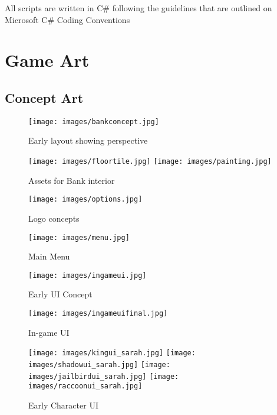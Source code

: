 \documentclass[14pt]{report}
\begin{document}
All scripts are written in C\# following the guidelines that are outlined on Microsoft C\# Coding Conventions

\chapter{Game Art}

\section{Concept Art}

\begin{figure}[H]
	\texttt{[image: images/bankconcept.jpg]}
    \caption{Early layout showing perspective}
\end{figure}

\begin{figure}[H]
    \centering
    \texttt{[image: images/floortile.jpg]}
    \texttt{[image: images/painting.jpg]}
    \caption{Assets for Bank interior}
\end{figure}

\begin{figure}[H]
	\texttt{[image: images/options.jpg]}
    \caption{Logo concepts}
\end{figure}

\begin{figure}[H]
	\texttt{[image: images/menu.jpg]}
    \caption{Main Menu}
\end{figure}

\begin{figure}[H]
	\texttt{[image: images/ingameui.jpg]}
    \caption{Early UI Concept}
\end{figure}

\begin{figure}[H]
	\texttt{[image: images/ingameuifinal.jpg]}
    \caption{In-game UI}
\end{figure}

\begin{figure}[H]
    \centering
	\texttt{[image: images/kingui\_sarah.jpg]}
	\texttt{[image: images/shadowui\_sarah.jpg]}
	\texttt{[image: images/jailbirdui\_sarah.jpg]}
	\texttt{[image: images/raccoonui\_sarah.jpg]}
    \caption{Early Character UI}
\end{figure}
\end{document}

